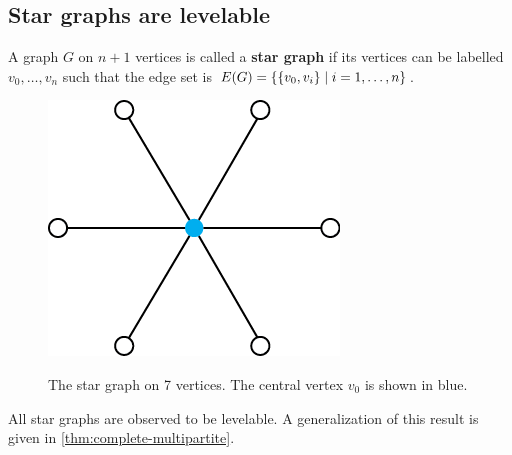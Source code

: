 \subsection{Star graphs are levelable} \label{subsec:star}
\begin{definition} \label{def:star}
A graph $G$ on $n+1$ vertices is called a \textbf{star graph} if its vertices can be labelled $v_0, \dots, v_n$ such that the edge set is $E(G) = \{ \{ v_0, v_i \} \; | \; i = 1, \dots, n \}$. 
\end{definition}

\begin{figure}[bth]
    \myfloatalign
    {\includegraphics[width=.3\linewidth]{figures/star.png}} 
    \caption{The star graph on 7 vertices. The central vertex $v_0$ is shown in blue.}
\end{figure}

All star graphs are observed to be levelable. A generalization of this result is given in \autoref{thm:complete-multipartite}.
